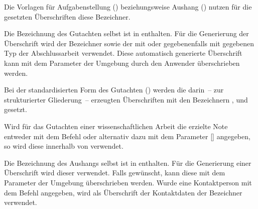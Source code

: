 \begin{Declaration*}{}
\begin{Declaration}{}
\begin{Declaration}{}
\printdeclarationlist%
%
Die Vorlagen für Aufgabenstellung () beziehungsweise Aushang 
() nutzen für die gesetzten Überschriften diese Bezeichner.
\end{Declaration}
\end{Declaration}

\begin{Declaration}{}
\begin{Declaration}{}
\printdeclarationlist%
%
Die Bezeichnung des Gutachten selbst ist in  enthalten. 
Für die Generierung der Überschrift wird der Bezeichner  
sowie der mit  oder gegebenenfalls mit  gegebenen 
Typ der Abschlussarbeit verwendet. Diese automatisch generierte Überschrift 
kann mit dem Parameter  der 
Umgebung  durch den Anwender überschrieben werden.
\end{Declaration}
\end{Declaration}

\begin{Declaration}{}
\begin{Declaration}{}
\printdeclarationlist%
%
Bei der standardisierten Form des Gutachten () werden die 
darin~-- zur strukturierter Gliederung~-- erzeugten Überschriften mit den 
Bezeichnern ,  und  
gesetzt.
\end{Declaration}
\end{Declaration}

\begin{Declaration}{}
\printdeclarationlist%
%
Wird für das Gutachten einer wissenschaftlichen Arbeit die erzielte Note 
entweder mit dem Befehl  oder alternativ dazu mit 
dem Parameter [] angegeben, so 
wird diese innerhalb von  verwendet.
\end{Declaration}

\begin{Declaration}{}
\begin{Declaration}[v2.02]{}
\printdeclarationlist%
%
Die Bezeichnung des Aushangs selbst ist in  enthalten. Für 
die Generierung einer Überschrift wird dieser verwendet. Falls gewünscht, kann 
diese mit dem Parameter  der Umgebung 
 überschrieben werden. Wurde eine Kontaktperson mit dem 
Befehl  angegeben, wird als Überschrift der Kontaktdaten 
der Bezeichner  verwendet.


\end{Declaration}
\end{Declaration}
\end{Declaration*}
